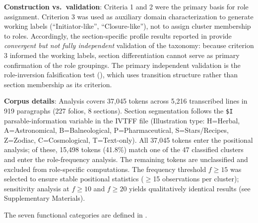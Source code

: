 \documentclass[11pt,a4paper,twocolumn]{article}
\begin{document}
\noindent\textbf{Construction vs.\ validation}: Criteria 1 and 2 were the primary basis for role assignment. Criterion 3 was used as auxiliary domain characterization to generate working labels (``Initiator-like'', ``Closure-like''), not to assign cluster membership to roles. Accordingly, the section-specific profile results reported in  provide \textit{convergent but not fully independent} validation of the taxonomy: because criterion 3 informed the working labels, section differentiation cannot serve as primary confirmation of the role groupings. The primary independent validation is the role-inversion falsification test (), which uses transition structure rather than section membership as its criterion.

\noindent\textbf{Corpus details}: Analysis covers 37,045 tokens across 5,216 transcribed lines in 919 paragraphs (227 folios, 8 sections). Section segmentation follows the \texttt{\$I} parsable-information variable in the IVTFF file (Illustration type: H=Herbal, A=Astronomical, B=Balneological, P=Pharmaceutical, S=Stars/Recipes, Z=Zodiac, C=Cosmological, T=Text-only). All 37,045 tokens enter the positional analysis; of these, 15,498 tokens (41.8\%) match one of the 47 classified clusters and enter the role-frequency analysis. The remaining tokens are unclassified and excluded from role-specific computations. The frequency threshold $f \geq 15$ was selected to ensure stable positional statistics ($\geq$15 observations per cluster); sensitivity analysis at $f \geq 10$ and $f \geq 20$ yields qualitatively identical results (see Supplementary Materials).

\noindent The seven functional categories are defined in .
\end{document}
